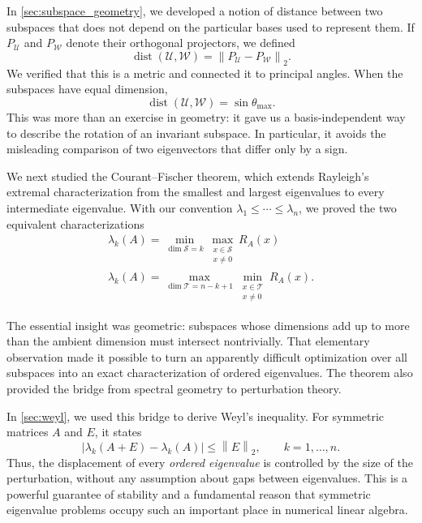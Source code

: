 \documentclass[14pt,letterpaper]{article}
\theoremstyle{plain}
\theoremstyle{definition}
\theoremstyle{remark}
\newcommand{\norm}[1]{\left\lVert #1 \right\rVert}
\newcommand{\abs}[1]{\left| #1 \right|}
\DeclareMathOperator{\dist}{dist}
\begin{document}
In \cref{sec:subspace_geometry}, we developed a notion of
distance between two subspaces that does not depend on the
particular bases used to represent them. If $P_{\mathcal U}$
and $P_{\mathcal W}$ denote their orthogonal projectors,
we defined
\[
\boxed{
\dist(\mathcal U,\mathcal W)
=\norm{P_{\mathcal U}-P_{\mathcal W}}_2.
}
\]
We verified that this is a metric and connected it to
principal angles. When the subspaces have equal dimension,
\[
\boxed{
\dist(\mathcal U,\mathcal W)=\sin\theta_{\max}.
}
\]
This was more than an exercise in geometry: it gave us a
basis-independent way to describe the rotation of an
invariant subspace. In particular, it avoids the misleading
comparison of two eigenvectors that differ only by a sign.

\begin{samepage}
We next studied the Courant--Fischer theorem, which extends
Rayleigh's extremal characterization from the smallest and
largest eigenvalues to every intermediate eigenvalue. With
our convention $\lambda_1\leq\cdots\leq\lambda_n$, we
proved the two equivalent characterizations
\begin{gather*}
\boxed{
\lambda_k(A)=
\min_{\dim\mathcal S=k}
\max_{\substack{x\in\mathcal S\\x\neq0}}R_A(x)
}\\[1.2ex]
\boxed{
\lambda_k(A)=
\max_{\dim\mathcal T=n-k+1}
\min_{\substack{x\in\mathcal T\\x\neq0}}R_A(x)
}.
\end{gather*}
\end{samepage}
The essential insight was geometric: subspaces whose
dimensions add up to more than the ambient dimension must
intersect nontrivially. That elementary observation made
it possible to turn an apparently difficult optimization
over all subspaces into an exact characterization of
ordered eigenvalues. The theorem also provided the bridge
from spectral geometry to perturbation theory.

In \cref{sec:weyl}, we used this bridge to derive Weyl's
inequality. For symmetric matrices $A$ and $E$, it states
\[
\boxed{
\abs{\lambda_k(A+E)-\lambda_k(A)}
\leq\norm{E}_2,
\qquad k=1,\ldots,n.
}
\]
Thus, the displacement of every \emph{ordered eigenvalue}
is controlled by the size of the perturbation, without any
assumption about gaps between eigenvalues. This is a
powerful guarantee of stability and a fundamental reason
that symmetric eigenvalue problems occupy such an
important place in numerical linear algebra.
\end{document}
